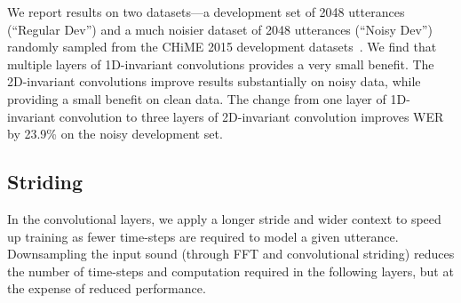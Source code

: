 We report results on two datasets---a development set of 2048 utterances
(``Regular Dev'') and a much noisier dataset of 2048 utterances (``Noisy Dev'')
randomly sampled from the CHiME 2015 development
datasets~\cite{barker2015chime}. We find that multiple layers of 1D-invariant
convolutions provides a very small benefit. The 2D-invariant convolutions
improve results substantially on noisy data, while providing a small benefit on
clean data. The change from one layer of 1D-invariant convolution to three
layers of 2D-invariant convolution improves WER by 23.9\% on the noisy
development set.


\subsection{Striding}

In the convolutional layers, we apply a longer stride and wider context to
speed up training as fewer time-steps are required to model a given utterance.
Downsampling the input sound (through FFT and convolutional striding) reduces
the number of time-steps and computation required in the following layers, but
at the expense of reduced performance. 

